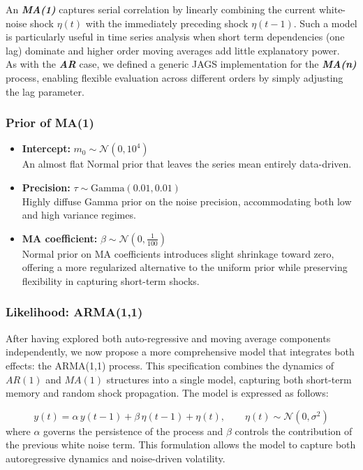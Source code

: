 \documentclass{Configuration_Files/PoliMi3i_thesis}
\begin{document}
An \textbf{\textit{MA(1)}} captures serial correlation by linearly combining the current white-noise shock \(\eta(t)\) with the immediately preceding shock \(\eta(t-1)\).  
Such a model is particularly useful in time series analysis when short term dependencies (one lag) dominate and higher order moving averages add little explanatory power.\\
As with the \textbf{\textit{AR}} case, we defined a generic JAGS implementation for the \textbf{\textit{MA(n)}} process, enabling flexible evaluation across different orders by simply adjusting the lag parameter.
\subsubsection{Prior of MA(1)}
\begin{itemize}
    \item \textbf{Intercept:} $m_0 \sim \mathcal{N}(0,10^4)$\\
    An almost flat Normal prior that leaves the series mean entirely data-driven.
    \item \textbf{Precision:} $\tau \sim \mathrm{Gamma}(0.01,0.01)$\\
    Highly diffuse Gamma prior on the noise precision, accommodating both low and high variance regimes.
    \item \textbf{MA coefficient:} $
\beta \sim \mathcal{N}\left(0, \frac{1}{100} \right)
$\\
Normal prior on MA coefficients introduces slight shrinkage toward zero, offering a more regularized alternative to the uniform prior while preserving flexibility in capturing short-term shocks.

\end{itemize}


\subsubsection{Likelihood: ARMA(1,1)}
After having explored both auto-regressive and moving average components independently, we now propose a more comprehensive model that integrates both effects: the ARMA(1,1) process. This specification combines the dynamics of $AR(1)$ and $MA(1)$ structures into a single model, capturing both short-term memory and random shock propagation. The model is expressed as follows:

\begin{equation}
y(t) = \alpha\, y(t-1) + \beta\, \eta(t-1) + \eta(t), \qquad \eta(t) \sim \mathcal{N}(0, \sigma^2)
\end{equation}
where $\alpha$ governs the persistence of the process and $\beta$ controls the contribution of the previous white noise term. This formulation allows the model to capture both autoregressive dynamics and noise-driven volatility.
\end{document}
